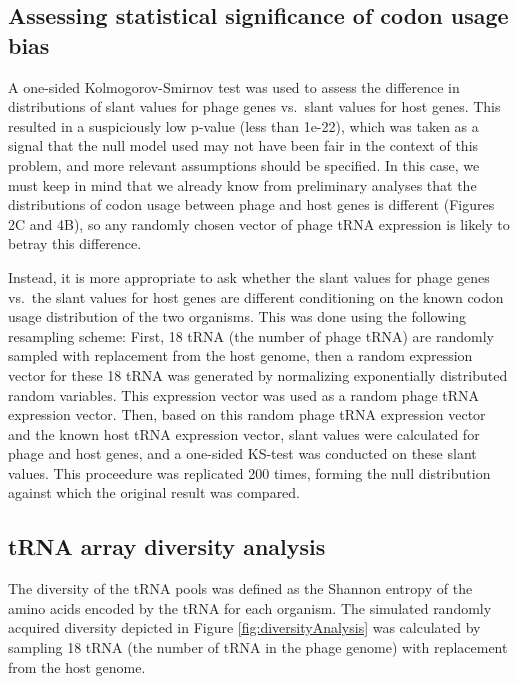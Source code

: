 \documentclass[12pt,twoside]{mitthesis-manusdown}
\begin{document}
\subsection{Assessing statistical significance of codon usage
bias}\label{assessing-statistical-significance-of-codon-usage-bias}

A one-sided Kolmogorov-Smirnov test was used to assess the difference in
distributions of slant values for phage genes vs.~slant values for host
genes. This resulted in a suspiciously low p-value (less than 1e-22),
which was taken as a signal that the null model used may not have been
fair in the context of this problem, and more relevant assumptions
should be specified. In this case, we must keep in mind that we already
know from preliminary analyses that the distributions of codon usage
between phage and host genes is different (Figures 2C and 4B), so any
randomly chosen vector of phage tRNA expression is likely to betray this
difference.

Instead, it is more appropriate to ask whether the slant values for
phage genes vs.~the slant values for host genes are different
conditioning on the known codon usage distribution of the two organisms.
This was done using the following resampling scheme: First, 18 tRNA (the
number of phage tRNA) are randomly sampled with replacement from the
host genome, then a random expression vector for these 18 tRNA was
generated by normalizing exponentially distributed random variables.
This expression vector was used as a random phage tRNA expression
vector. Then, based on this random phage tRNA expression vector and the
known host tRNA expression vector, slant values were calculated for
phage and host genes, and a one-sided KS-test was conducted on these
slant values. This proceedure was replicated 200 times, forming the null
distribution against which the original result was compared.

\subsection{tRNA array diversity
analysis}\label{trna-array-diversity-analysis}

The diversity of the tRNA pools was defined as the Shannon entropy of
the amino acids encoded by the tRNA for each organism. The simulated
randomly acquired diversity depicted in Figure
\ref{fig:diversityAnalysis} was calculated by sampling 18 tRNA (the
number of tRNA in the phage genome) with replacement from the host
genome.
\end{document}
